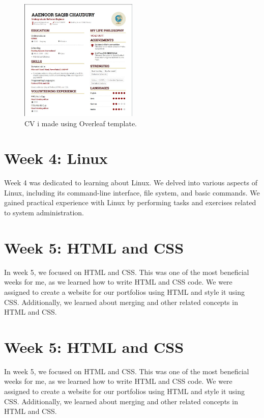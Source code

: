 \documentclass{article}
\begin{document}
\begin{figure}[ht]
  \centering
  \includegraphics[width=0.5\textwidth]{CVss}
  \caption{CV i made using Overleaf template.}
  \label{fig:week3_image}
\end{figure}

\section{Week 4: Linux}
Week 4 was dedicated to learning about Linux. We delved into various aspects of Linux, including its command-line interface, file system, and basic commands. We gained practical experience with Linux by performing tasks and exercises related to system administration.



\section{Week 5: HTML and CSS}
In week 5, we focused on HTML and CSS. This was one of the most beneficial weeks for me, as we learned how to write HTML and CSS code. We were assigned to create a website for our portfolios using HTML and style it using CSS. Additionally, we learned about merging and other related concepts in HTML and CSS.

\section{Week 5: HTML and CSS}
In week 5, we focused on HTML and CSS. This was one of the most beneficial weeks for me, as we learned how to write HTML and CSS code. We were assigned to create a website for our portfolios using HTML and style it using CSS. Additionally, we learned about merging and other related concepts in HTML and CSS.
\end{document}
